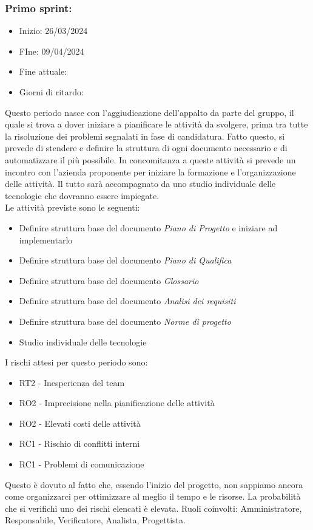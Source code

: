 \documentclass[italian,12pt]{article} %
\begin{document}
    \subsubsection{Primo sprint:}
        \begin{itemize}
            \item Inizio: 26/03/2024
            \item FIne: 09/04/2024
            \item Fine attuale:
            \item Giorni di ritardo:
        \end{itemize}
        Questo periodo nasce con l'aggiudicazione dell'appalto da parte del gruppo, il quale si trova a dover iniziare a pianificare le attività da svolgere, prima tra tutte la risoluzione dei problemi segnalati in fase di candidatura. Fatto questo, si prevede di stendere e definire la struttura di ogni documento necessario e di automatizzare il più possibile. In concomitanza a queste attività si prevede un incontro con l'azienda proponente per iniziare la formazione e l'organizzazione delle attività. Il tutto sarà accompagnato da uno studio individuale delle tecnologie che dovranno essere impiegate.\\ Le attività previste sono le seguenti:
        \begin{itemize}
            \item Definire struttura base del documento \textit{Piano di Progetto} e iniziare ad implementarlo
            \item Definire struttura base del documento \textit{Piano di Qualifica}
            \item Definire struttura base del documento \textit{Glossario}
            \item Definire struttura base del documento \textit{Analisi dei requisiti}
            \item Definire struttura base del documento \textit{Norme di progetto}
            \item Studio individuale delle tecnologie
        \end{itemize}
        I rischi attesi per questo periodo sono:
        \begin{itemize}
            \item RT2 - Inesperienza del team
            \item RO2 - Imprecisione nella pianificazione delle attività
            \item RO2 - Elevati costi delle attività
            \item RC1 - Rischio di conflitti interni 
            \item RC1 - Problemi di comunicazione
        \end{itemize}
        Questo è dovuto al fatto che, essendo l'inizio del progetto, non sappiamo ancora come organizzarci per ottimizzare al meglio il tempo e le risorse. La probabilità che si verifichi uno dei rischi elencati è elevata.
        Ruoli coinvolti: Amministratore, Responsabile, Verificatore, Analista, Progettista.
\end{document}
